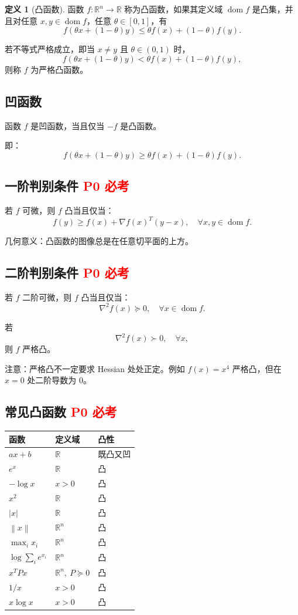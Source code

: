 \documentclass[11pt,a4paper]{ctexart}
\newcommand{\R}{\mathbb{R}}
\newcommand{\dom}{\operatorname{dom}}
\newcommand{\norm}[1]{\left\lVert #1 \right\rVert}
\newcommand{\Pzero}{\textcolor{red}{\textbf{P0 必考}}}
\theoremstyle{definition}
\newtheorem{definition}{定义}[section]
\theoremstyle{plain}
\theoremstyle{remark}
\begin{document}
\begin{definition}[凸函数]
函数 $f:\R^n\to\R$ 称为凸函数，如果其定义域 $\dom f$ 是凸集，并且对任意 $x,y\in\dom f$，任意 $\theta\in[0,1]$，有
\[
    f(\theta x+(1-\theta)y)
    \le
    \theta f(x)+(1-\theta)f(y).
\]
\end{definition}

若不等式严格成立，即当 $x\neq y$ 且 $\theta\in(0,1)$ 时，
\[
    f(\theta x+(1-\theta)y)
    <
    \theta f(x)+(1-\theta)f(y),
\]
则称 $f$ 为严格凸函数。

\subsection{凹函数}

函数 $f$ 是凹函数，当且仅当 $-f$ 是凸函数。

即：
\[
    f(\theta x+(1-\theta)y)
    \ge
    \theta f(x)+(1-\theta)f(y).
\]

\subsection{一阶判别条件 \Pzero}

若 $f$ 可微，则 $f$ 凸当且仅当：
\[
    f(y) \ge f(x)+\nabla f(x)^T(y-x),
    \quad \forall x,y\in\dom f.
\]

几何意义：凸函数的图像总是在任意切平面的上方。

\subsection{二阶判别条件 \Pzero}

若 $f$ 二阶可微，则 $f$ 凸当且仅当：
\[
    \nabla^2 f(x) \succeq 0,\quad \forall x\in\dom f.
\]

若
\[
    \nabla^2 f(x) \succ 0,\quad \forall x,
\]
则 $f$ 严格凸。

注意：严格凸不一定要求 Hessian 处处正定。例如 $f(x)=x^4$ 严格凸，但在 $x=0$ 处二阶导数为 $0$。

\subsection{常见凸函数 \Pzero}

\begin{center}
\begin{tabular}{lll}
\toprule
函数 & 定义域 & 凸性 \\
\midrule
$ax+b$ & $\R$ & 既凸又凹 \\
$e^x$ & $\R$ & 凸 \\
$-\log x$ & $x>0$ & 凸 \\
$x^2$ & $\R$ & 凸 \\
$|x|$ & $\R$ & 凸 \\
$\norm{x}$ & $\R^n$ & 凸 \\
$\max_i x_i$ & $\R^n$ & 凸 \\
$\log\sum_i e^{x_i}$ & $\R^n$ & 凸 \\
$x^T P x$ & $\R^n,\ P\succeq0$ & 凸 \\
$1/x$ & $x>0$ & 凸 \\
$x\log x$ & $x>0$ & 凸 \\
\bottomrule
\end{tabular}
\end{center}
\end{document}
